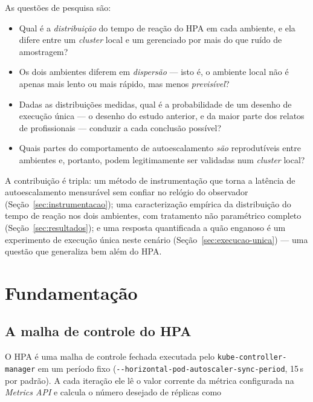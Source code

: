 \documentclass[conference]{IEEEtran}
\begin{document}
As questões de pesquisa são:

\begin{itemize}
\item[\textbf{QP1}] Qual é a \emph{distribuição} do tempo de reação do HPA em
cada ambiente, e ela difere entre um \emph{cluster} local e um gerenciado por
mais do que ruído de amostragem?
\item[\textbf{QP2}] Os dois ambientes diferem em \emph{dispersão} --- isto é, o
ambiente local não é apenas mais lento ou mais rápido, mas menos
\emph{previsível}?
\item[\textbf{QP3}] Dadas as distribuições medidas, qual é a probabilidade de um
desenho de execução única --- o desenho do estudo anterior, e da maior parte dos
relatos de profissionais --- conduzir a cada conclusão possível?
\item[\textbf{QP4}] Quais partes do comportamento de autoescalamento \emph{são}
reprodutíveis entre ambientes e, portanto, podem legitimamente ser validadas num
\emph{cluster} local?
\end{itemize}

A contribuição é tripla: um método de instrumentação que torna a latência de
autoescalamento mensurável sem confiar no relógio do observador
(Seção~\ref{sec:instrumentacao}); uma caracterização empírica da distribuição do
tempo de reação nos dois ambientes, com tratamento não paramétrico completo
(Seção~\ref{sec:resultados}); e uma resposta quantificada a quão enganoso é um
experimento de execução única neste cenário
(Seção~\ref{sec:execucao-unica}) --- uma questão que generaliza bem além do HPA.

\section{Fundamentação}
\label{sec:background}

\subsection{A malha de controle do HPA}

O HPA é uma malha de controle fechada executada pelo
\texttt{kube-controller-manager} em um período fixo
(\texttt{-{}-horizontal-pod-autoscaler-sync-period}, 15\,s por padrão). A cada
iteração ele lê o valor corrente da métrica configurada na \emph{Metrics API} e
calcula o número desejado de réplicas como~\cite{k8salgo}
\end{document}
